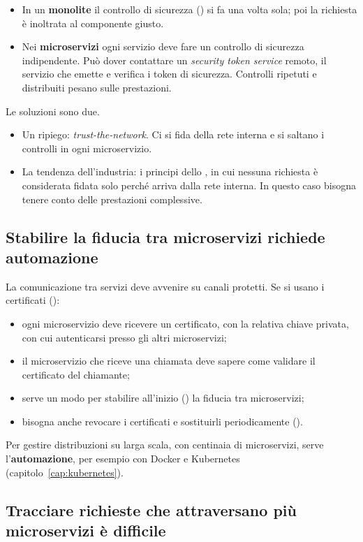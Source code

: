 \begin{itemize}
  \item In un \textbf{monolite} il controllo di sicurezza () si fa una volta sola; poi la
    richiesta è inoltrata al componente giusto.
  \item Nei \textbf{microservizi} ogni servizio deve fare un controllo di sicurezza indipendente. Può dover contattare
    un \emph{security token service} remoto, il servizio che emette e verifica i token di sicurezza. Controlli ripetuti
    e distribuiti pesano sulle prestazioni.
\end{itemize}
Le soluzioni sono due.
\begin{itemize}
  \item Un ripiego: \emph{trust-the-network}. Ci si fida della rete interna e si saltano i controlli in ogni
    microservizio.
  \item La tendenza dell'industria: i principi dello , in cui nessuna richiesta è
    considerata fidata solo perché arriva dalla rete interna. In questo caso bisogna tenere conto delle prestazioni
    complessive.
\end{itemize}

\subsection{Stabilire la fiducia tra microservizi richiede automazione}

La comunicazione tra servizi deve avvenire su canali protetti. Se si usano i certificati ():
\begin{itemize}
  \item ogni microservizio deve ricevere un certificato, con la relativa chiave privata, con cui autenticarsi presso
    gli altri microservizi;
  \item il microservizio che riceve una chiamata deve sapere come validare il certificato del chiamante;
  \item serve un modo per stabilire all'inizio () la fiducia tra microservizi;
  \item bisogna anche revocare i certificati e sostituirli periodicamente ().
\end{itemize}
Per gestire distribuzioni su larga scala, con centinaia di microservizi, serve l'\textbf{automazione}, per esempio con
Docker e Kubernetes (capitolo~\ref{cap:kubernetes}).

\subsection{Tracciare richieste che attraversano più microservizi è difficile}

